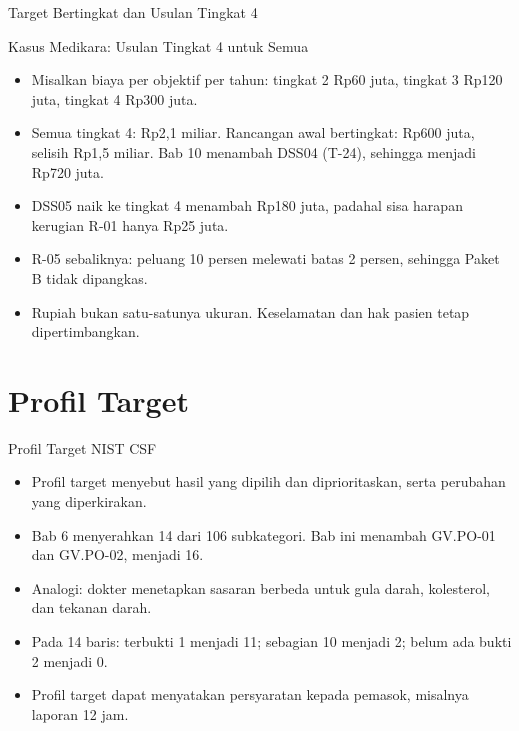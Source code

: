 \documentclass[aspectratio=169, table, 12pt]{beamer}
\begin{document}
\begin{frame}{{\Large Target Bertingkat dan Usulan Tingkat 4}}
  \begin{center}
    \resizebox{!}{0.74\textheight}{}
  \end{center}
\end{frame}

\begin{frame}{{\Large Kasus Medikara: Usulan Tingkat 4 untuk Semua}}
  \vspace{6pt}
  \small
  \begin{itemize}
    \item Misalkan biaya per objektif per tahun: tingkat 2 Rp60 juta, tingkat 3 Rp120 juta,
          tingkat 4 Rp300 juta.
    \item Semua tingkat 4: Rp2,1 miliar. Rancangan awal bertingkat: Rp600 juta, selisih Rp1,5 miliar.
          Bab 10 menambah DSS04 (T-24), sehingga menjadi Rp720 juta.
    \item DSS05 naik ke tingkat 4 menambah Rp180 juta, padahal sisa harapan kerugian R-01 hanya Rp25
          juta.
    \item R-05 sebaliknya: peluang 10 persen melewati batas 2 persen, sehingga Paket B tidak
          dipangkas.
    \item Rupiah bukan satu-satunya ukuran. Keselamatan dan hak pasien tetap dipertimbangkan.
  \end{itemize}
\end{frame}

\section{Profil Target}

\begin{frame}{{\Large Profil Target NIST CSF}}
  \vspace{6pt}
  \small
  \begin{itemize}
    \item Profil target menyebut hasil yang dipilih dan diprioritaskan, serta perubahan yang
          diperkirakan.
    \item Bab 6 menyerahkan 14 dari 106 subkategori. Bab ini menambah GV.PO-01 dan GV.PO-02, menjadi
          16.
    \item Analogi: dokter menetapkan sasaran berbeda untuk gula darah, kolesterol, dan tekanan
          darah.
    \item Pada 14 baris: terbukti 1 menjadi 11; sebagian 10 menjadi 2; belum ada bukti 2 menjadi 0.
    \item Profil target dapat menyatakan persyaratan kepada pemasok, misalnya laporan 12 jam.
  \end{itemize}
\end{frame}
\end{document}
